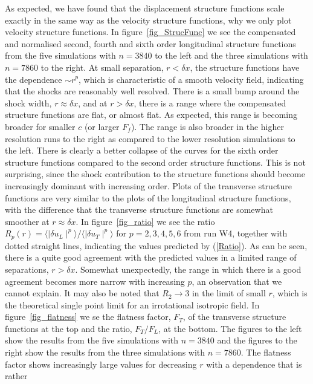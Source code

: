 As expected, we have found that the displacement structure functions scale
exactly in the same way as the velocity structure functions, why we only plot
velocity structure functions. In figure~\ref{fig_StrucFunc} we see the
compensated and normalised second, fourth and sixth order longitudinal
structure functions from the five simulations with $ n = 3840 $ to the left and
the three simulations with $ n = 7860 $ to the right. At small separation, $ r
< \delta x $, the structure functions have the dependence $ \sim r^{p} $, which
is characteristic of a smooth velocity field, indicating that the shocks are
reasonably well resolved. There is a small bump around the shock width, $ r
\approx \delta x $, and at $ r > \delta x $, there is a range where the
compensated structure functions are flat, or almost flat. As expected, this
range is becoming broader for smaller $ c $ (or larger $ F_f $). The range is
also broader in the higher resolution runs to the right as compared to the
lower resolution simulations to the left. There is clearly a better collapse of
the curves for the sixth order structure functions compared to the second order
structure functions. This is not surprising, since the shock contribution to
the structure functions should become increasingly dominant with increasing
order. Plots of the transverse structure functions are very similar to the
plots of the longitudinal structure functions, with the difference that the
transverse structure functions are somewhat smoother at $ r \approx \delta x $.
In figure~\ref{fig_ratio} we see the ratio $ R_{p}(r) = \langle \mid \delta
u_L \mid ^{p} \rangle / \langle \mid \delta u_T \mid ^{p} \rangle$ for $ p=
2,3,4,5,6 $ from run W4, together with dotted straight lines, indicating the
values predicted by (\ref{Ratio}). As can be seen, there is a quite good
agreement with the predicted values in a limited range of separations, $ r >
\delta x $. Somewhat unexpectedly, the range in which there is a good agreement
becomes more narrow with increasing $ p $, an observation that we cannot
explain. It may also be noted that $ R_2 \rightarrow 3 $ in the limit of small
$ r $, which is the theoretical single point limit for an irrotational
isotropic field. In figure~\ref{fig_flatness} we se the flatness factor, $
F_T $, of the transverse structure functions at the top and the ratio, $
F_T/F_L $, at the bottom. The figures to the left show the results from the
five simulations with $ n = 3840 $ and the figures to the right show the
results from the three simulations with $ n = 7860 $. The flatness factor shows
increasingly large values for decreasing $ r $ with a dependence that is rather
